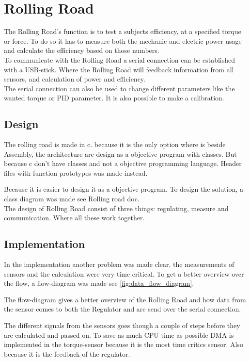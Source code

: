 \section{Rolling Road}
The Rolling Road's function is to test a subjects efficiency, at a specified torque or force. To do so it has to measure both the mechanic and electric power usage and calculate the efficiency based on those numbers.\\


To communicate with the Rolling Road a serial connection can be established with a USB-stick. Where the Rolling Road will feedback information from all sensors, and calculation of power and efficiency.\\ The serial connection can also be used to change different parameters like the wanted torque or PID parameter. It is also possible to make a calibration.

\subsection{Design}
The rolling road is made in c. because it is the only option where is beside Assembly, the architecture are design as a objective program with classes. But because c don't have classes and not a objective programming language. Header files with function prototypes was made instead. 

Because it is easier to design it as a objective program. To design the solution, a class diagram was made see Rolling road doc.\\

The design of Rolling Road consist of three things: regulating, measure and communication. Where all these work together.\\

\subsection{Implementation}
In the implementation another problem was made clear, the measurements of sensors and the calculation were very time critical. To get a better overview over the flow, a flow-diagram was made see \vref{fig:data_flow_diagram}.

The flow-diagram gives a better overview of the Rolling Road and how data from the sensor comes to both the Regulator and are send over the serial connection.

The different signals from the sensors goes though a couple of steps before they are calculated and passed on. To save as much CPU time as possible DMA is implemented in the torque-sensor because it is the most time critics sensor. Also because it is the feedback of the regulator.  

